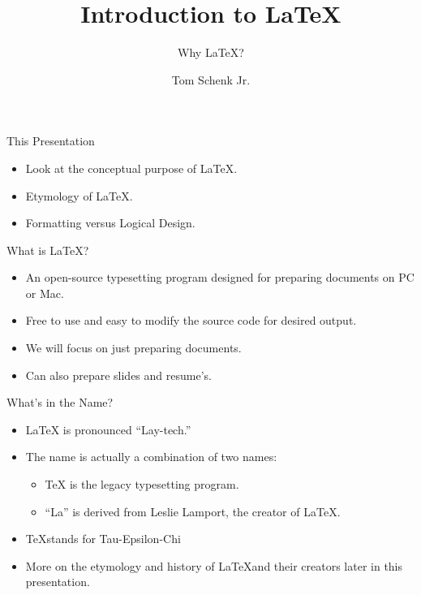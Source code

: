\documentclass[pdf]{prosper}
\title{Introduction to \LaTeX}
\subtitle{Why \LaTeX?}
\author{Tom Schenk Jr.}
\begin{document}
\maketitle
\begin{slide}{This Presentation}
	\begin{itemize}
		\item Look at the conceptual purpose of \LaTeX.
		\item Etymology of \LaTeX.
		\item Formatting versus Logical Design.
	\end{itemize}
\end{slide}
\begin{slide}{What is \LaTeX?}
	\begin{itemize}
		\item An open-source typesetting program designed for preparing documents on PC or Mac.
		\item Free to use and easy to modify the source code for desired output.
		\item We will focus on just preparing documents.
		\item Can also prepare slides and resume's.
	\end{itemize}
\end{slide}
\begin{slide}{What's in the Name?}
	\begin{itemize}
		\item \LaTeX\mbox{} is pronounced ``Lay-tech.''
		\item The name is actually a combination of two names:
			\begin{itemize}
				\item \TeX\mbox{} is the legacy typesetting program.
				\item ``La'' is derived from Leslie Lamport, the creator of \LaTeX.
			\end{itemize}
		\item \TeX stands for Tau-Epsilon-Chi
		\item More on the etymology and history of \LaTeX and their creators later in this presentation.
	\end{itemize}
\end{slide}
\end{document}
